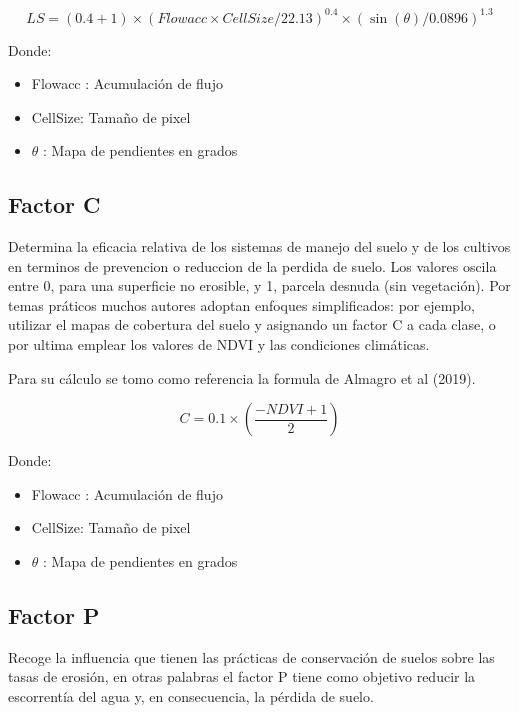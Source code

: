 \documentclass[
  letterpaper,
  DIV=11,
  numbers=noendperiod]{scrreprt}
\begin{document}
\begin{equation}
    LS = (0.4 + 1) \times (Flowacc\times CellSize /22.13)^{0.4} \times (\sin(\theta)/0.0896)^{1.3} 
\end{equation}

Donde:

\begin{itemize}
\item
  Flowacc : Acumulación de flujo
\item
  CellSize: Tamaño de pixel
\item
  \(\theta\) : Mapa de pendientes en grados
\end{itemize}

\hypertarget{factor-c}{%
\subsection{Factor C}\label{factor-c}}

Determina la eficacia relativa de los sistemas de manejo del suelo y de
los cultivos en terminos de prevencion o reduccion de la perdida de
suelo. Los valores oscila entre 0, para una superficie no erosible, y 1,
parcela desnuda (sin vegetación). Por temas práticos muchos autores
adoptan enfoques simplificados: por ejemplo, utilizar el mapas de
cobertura del suelo y asignando un factor C a cada clase, o por ultima
emplear los valores de NDVI y las condiciones climáticas.

Para su cálculo se tomo como referencia la formula de Almagro et al
(2019).

\begin{equation}
    C = 0.1 \times(\frac{-NDVI + 1}{2})
\end{equation}

Donde:

\begin{itemize}
\item
  Flowacc : Acumulación de flujo
\item
  CellSize: Tamaño de pixel
\item
  \(\theta\) : Mapa de pendientes en grados
\end{itemize}

\hypertarget{factor-p}{%
\subsection{Factor P}\label{factor-p}}

Recoge la influencia que tienen las prácticas de conservación de suelos
sobre las tasas de erosión, en otras palabras el factor P tiene como
objetivo reducir la escorrentía del agua y, en consecuencia, la pérdida
de suelo.
\end{document}
